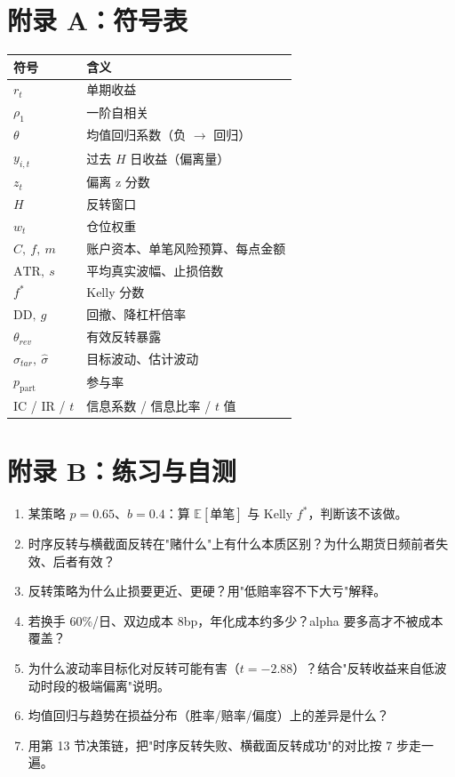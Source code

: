 \documentclass[UTF8,11pt]{ctexart}
\begin{document}
\section*{附录 A：符号表}
\begin{center}
\setlength{\tabcolsep}{6pt}
\renewcommand{\arraystretch}{1.4}
\begin{tabular}{@{}ll@{}}
\toprule
符号 & 含义 \\
\midrule
$r_t$ & 单期收益 \\
$\rho_1$ & 一阶自相关 \\
$\theta$ & 均值回归系数（负 $\to$ 回归） \\
$y_{i,t}$ & 过去 $H$ 日收益（偏离量） \\
$z_t$ & 偏离 z 分数 \\
$H$ & 反转窗口 \\
$w_t$ & 仓位权重 \\
$C,\ f,\ m$ & 账户资本、单笔风险预算、每点金额 \\
$\text{ATR},\ s$ & 平均真实波幅、止损倍数 \\
$f^{*}$ & Kelly 分数 \\
$\mathrm{DD},\ g$ & 回撤、降杠杆倍率 \\
$\theta_{rev}$ & 有效反转暴露 \\
$\sigma_{tar},\ \hat\sigma$ & 目标波动、估计波动 \\
$p_{\text{part}}$ & 参与率 \\
IC / IR / $t$ & 信息系数 / 信息比率 / $t$ 值 \\
\bottomrule
\end{tabular}
\end{center}

\section*{附录 B：练习与自测}
\begin{enumerate}[itemsep=2pt]
\item 某策略 $p=0.65$、$b=0.4$：算 $\mathbb{E}[\text{单笔}]$ 与 Kelly $f^{*}$，判断该不该做。
\item 时序反转与横截面反转在"赌什么"上有什么本质区别？为什么期货日频前者失效、后者有效？
\item 反转策略为什么止损要更近、更硬？用"低赔率容不下大亏"解释。
\item 若换手 60\%/日、双边成本 8bp，年化成本约多少？alpha 要多高才不被成本覆盖？
\item 为什么波动率目标化对反转可能有害（$t=-2.88$）？结合"反转收益来自低波动时段的极端偏离"说明。
\item 均值回归与趋势在损益分布（胜率/赔率/偏度）上的差异是什么？
\item 用第 13 节决策链，把"时序反转失败、横截面反转成功"的对比按 7 步走一遍。
\end{enumerate}
\end{document}
